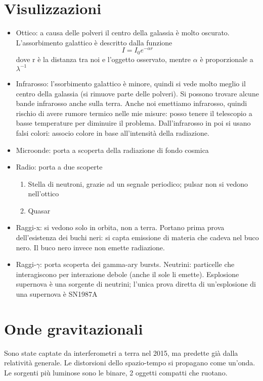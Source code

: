 \documentclass[a4paper,11pt]{report}
\theoremstyle{remark}
\theoremstyle{definition}
\begin{document}
\section*{Visulizzazioni}
\begin{itemize}
    \item Ottico: a causa delle polveri il centro della galassia è molto oscurato. L'assorbimento galattico è descritto dalla funzione
    \begin{equation*}
        I= I_0 e^{-\alpha r}
    \end{equation*}
    dove r è la distanza tra noi e l'oggetto osservato, mentre $\alpha$ è proporzionale a $\lambda^{-1}$
    \item Infrarosso: l'ssorbimento galattico è minore, quindi si vede molto meglio il centro della galassia (si rimuove parte delle polveri). Si possono trovare alcune bande infrarosso anche sulla terra. Anche noi emettiamo infrarosso, quindi rischio di avere rumore termico nelle mie misure: posso tenere il telescopio a basse temperature per diminuire il problema. \newline
    Dall'infrarosso in poi si usano falsi colori: associo colore in base all'intensità della radiazione.
    \item Microonde: porta a scoperta della radiazione di fondo cosmica
    \item Radio: porta a due scoperte
    \begin{enumerate}
        \item Stella di neutroni, grazie ad un segnale periodico; pulsar non si vedono nell'ottico
        \item Quasar
    \end{enumerate}
    \item Raggi-x: si vedono solo in orbita, non a terra. Portano prima prova dell'esistenza dei buchi neri: si capta emissione di materia che cadeva nel buco nero. Il buco nero invece non emette radiazione.
    \item Raggi-$\gamma$: porta scoperta dei gamma-ary bursts. \newline
    Neutrini: particelle che interagiscono per interazione debole (anche il sole li emette). Esplosione supernova è una sorgente di neutrini; l'unica prova diretta di un'esplosione di una supernova è SN1987A
\end{itemize}

\section*{Onde gravitazionali}
Sono state captate da interferometri a terra nel 2015, ma predette già dalla relatività generale. Le distorsioni dello spazio-tempo si propagano come un'onda. \newline
Le sorgenti più luminose sono le binare, 2 oggetti compatti che ruotano.
\end{document}
